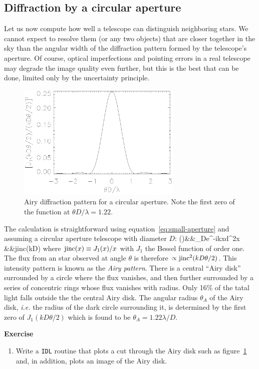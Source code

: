 \subsection{Diffraction by a circular aperture}

Let us now compute how well a telescope can distinguish neighboring stars. We cannot expect to
resolve them (or any two objects) that are closer together in the sky than the angular width
of the diffraction pattern formed by the telescope's aperture. Of course, optical imperfections
and pointing errors in a real telescope may degrade the image quality even further, but this
is the best that can be done, limited only by the uncertainty principle.

\begin{figure}[th!]
	\centering
	\includegraphics[width=0.7\textwidth]{jinc2.eps}
  \caption{Airy diffraction pattern for a circular aperture. Note the first zero
of the function at $\theta D/\lambda=1.22$.}
  \label{fig:jinc2}
\end{figure}

The calculation is straightforward using equation~\ref{eq:small-aperture} and assuming a circular
aperture telescope with diameter $D$:
\bua
\psi(\theta)&\propto&\int_{\pi D}e^{-ik{\bm x}\cdot{\bm\theta}}d^2x \\
            &\propto&{\rm jinc}\left({kD\theta{}}\right)
\eua
where ${\rm jinc}(x)\equiv {J_1(x)/x}$ with $J_1$ the Bessel function of order one. The
flux from an star observed at angle $\theta$ is therefore $\propto{\rm jinc}^2({kD\theta/2})$.
This intensity pattern is known as the {\it Airy pattern}. There is a central ``Airy disk'' 
surrounded by a circle where the flux vanishes, and then further surrounded by a series of 
concentric rings whose flux vanishes with radius. Only 16\% of the tatal light falls outside
the the central Airy disk. The angular radius $\theta_A$ of the Airy disk, {\it i.e.} the 
radius of the dark circle surrounding it, is determined by the first zero of 
$J_1({kD\theta/2})$ which is found to be $\theta_A={1.22\lambda/D}$. 

{\bf Exercise}

\begin{enumerate}
\setcounter{enumi}{\value{count}}
\item Write a {\tt IDL} routine that plots a cut through the Airy disk such as figure~\ref{fig:jinc2}
and, in addition, plots an image of the Airy disk.
\setcounter{count}{\value{enumi}}
\end{enumerate}

%

